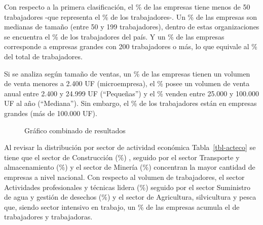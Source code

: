 \documentclass[
  11pt,
]{article}
\begin{document}
Con respecto a la primera clasificación, el \% de las
empresas tiene menos de 50 trabajadores -que representa el \%
de los trabajadores-. Un \% de las empresas son medianas de
tamaño (entre 50 y 199 trabajadores), dentro de estas organizaciones se
encuentra el \% de los trabajadores del país. Y un \%
de las empresas corresponde a empresas grandes con 200 trabajadores o
más, lo que equivale al \% del total de trabajadores.

Si se analiza según tamaño de ventas, un \% de las empresas
tienen un volumen de venta menores a 2.400 UF (microempresa), el
\% posee un volumen de venta anual entre 2.400 y 24.999 UF
(``Pequeñas'') y el \% venden entre 25.000 y 100.000 UF al año
(``Mediana''). Sin embargo, el \% de los trabajadores están en
empresas grandes (más de 100.000 UF).

\FloatBarrier

\begin{figure}[H]

\caption{\label{fig-combined}Gráfico combinado de resultados}


\end{figure}%

\FloatBarrier

Al revisar la distribución por sector de actividad económica
Tabla~\ref{tbl-acteco} se tiene que el sector de Construcción
(\%) , seguido por el sector Transporte y almacenamiento
(\%) y el sector de Minería (\%) concentran la
mayor cantidad de empresas a nivel nacional. Con respecto al volumen de
trabajadores, el sector Actividades profesionales y técnicas lidera
(\%) seguido por el sector Suministro de agua y gestión de
desechos (\%) y el sector de Agricultura, silvicultura y
pesca que, siendo sector intensivo en trabajo, un \% de las
empresas acumula el  de trabajadores y trabajadoras.
\end{document}
